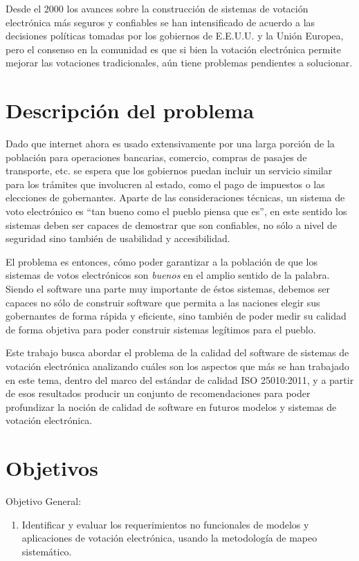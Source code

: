 Desde el 2000 los avances sobre la construcción de sistemas de votación
electrónica más seguros y confiables se han intensificado de acuerdo a las 
decisiones políticas tomadas por los gobiernos de E.E.U.U. y la Unión Europea, pero 
el consenso en la comunidad es que si bien la votación electrónica permite
mejorar las votaciones tradicionales, aún tiene problemas pendientes a 
solucionar.

\newpage
\section{Descripción del problema}

Dado que internet ahora es usado extensivamente por una larga porción de la población
para operaciones bancarias, comercio, compras de pasajes de transporte, etc. se espera 
que los gobiernos puedan incluir un servicio similar para los trámites que involucren al estado,
como el pago de impuestos o las elecciones de gobernantes. Aparte de las consideraciones
técnicas, un sistema de voto electrónico es ``tan bueno como el pueblo piensa que es'', en 
este sentido los sistemas deben ser capaces de demostrar que son confiables, no sólo a nivel
de seguridad sino también de usabilidad y accesibilidad. 

El problema es entonces, cómo poder garantizar a la población de que los sistemas de votos electrónicos
son \textit{buenos} en el amplio sentido de la palabra. Siendo el software una parte muy importante
de éstos sistemas, debemos ser capaces no sólo de construir software que permita a las naciones
elegir sus gobernantes de forma rápida y eficiente, sino también de poder medir su calidad de forma
objetiva para poder construir sistemas legítimos para el pueblo.

Este trabajo busca abordar el problema de la calidad del software de sistemas de votación electrónica
analizando cuáles son los aspectos que más se han trabajado en este tema, dentro del marco del
estándar de calidad ISO 25010:2011, y a partir de esos resultados producir un conjunto de 
recomendaciones para poder profundizar la noción de calidad de software en futuros modelos y sistemas
de votación electrónica.

\newpage
\section{Objetivos}

Objetivo General: 

\begin{enumerate}

	\item[] Identificar y evaluar los requerimientos no funcionales de modelos y 
	aplicaciones de votación electrónica, usando la metodología de mapeo 
	sistemático.

\end{enumerate}

